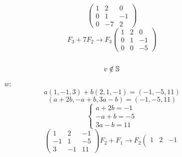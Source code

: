 \documentclass[../practica.root.tex]{subfiles}
\begin{document}
\begin{enumerate}
\begin{enumerate}
\begin{itemize}
\[                                  \left(
                                  \begin{array}{cc|c}
                                          1 & 2  & 0  \\
                                          0 & 1  & -1 \\
                                          0 & -7 & 2
                                      \end{array}
                                  \right)
                              \] \[
                                  F_3 + 7F_2 \to F_3
                                  \left(
                                  \begin{array}{cc|c}
                                          1 & 2 & 0  \\
                                          0 & 1 & -1 \\
                                          0 & 0 & -5
                                      \end{array}
                                  \right)
                              \] \[ v \notin \S \]
                        \item[$w$:] \[ a(1, -1, 3) + b(2, 1, -1) = (-1, -5, 11) \]
                              \[ (a + 2b, -a + b, 3a - b) = (-1, -5, 11) \]
                              \[
                                  \begin{cases}
                                      a + 2b = -1 \\
                                      -a + b = -5 \\
                                      3a - b = 11
                                  \end{cases} \]
                              \[
                                  \left(
                                  \begin{array}{cc|c}
                                          1  & 2  & -1 \\
                                          -1 & 1  & -5 \\
                                          3  & -1 & 11
                                      \end{array}
                                  \right)
                                  F_2 + F_1 \to F_2
                                  \left(
                                  \begin{array}{cc|c}
                                          1 & 2  & -1 \\

\end{array}\]
\end{itemize}
\end{enumerate}
\end{enumerate}
\end{document}
